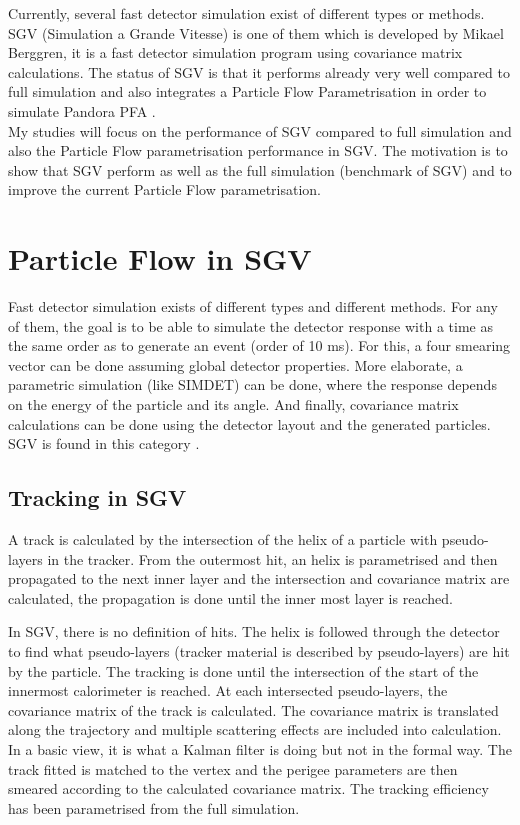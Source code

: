 Currently, several fast detector simulation exist of different types or methods. SGV (Simulation a Grande Vitesse) is one of them which is developed by Mikael Berggren, it is a fast detector simulation program using covariance matrix calculations. The status of SGV is that it performs already very well compared to full simulation and also integrates a Particle Flow Parametrisation in order to simulate Pandora PFA \cite{Berggren}.\\

My studies will focus on the performance of SGV compared to full simulation and also the Particle Flow parametrisation performance in SGV. The motivation is to show that SGV perform as well as the full simulation (benchmark of SGV) and to improve the current Particle Flow parametrisation.

\section{Particle Flow in SGV}

Fast detector simulation exists of different types and different methods. For any of them, the goal is to be able to simulate the detector response with a time as the same order as to generate an event (order of 10 ms).
For this, a four smearing vector can be done assuming global detector properties. More elaborate, a parametric simulation (like SIMDET) can be done, where the response depends on the energy of the particle and its angle.
And finally, covariance matrix calculations can be done using the detector layout and the generated particles. SGV is found in this category \cite{Berggren}.

\subsection{Tracking in SGV}

A track is calculated by the intersection of the helix of a particle with pseudo-layers in the tracker. From the outermost hit, an helix is parametrised and then propagated to the next inner layer and the intersection and covariance matrix are calculated, the propagation is done until the inner most layer is reached.

In SGV, there is no definition of hits. The helix is followed through the detector to find what pseudo-layers (tracker material is described by pseudo-layers) are hit by the particle. The tracking is done until the intersection of the start of the innermost calorimeter is reached. At each intersected pseudo-layers, the covariance matrix of the track is calculated.  The covariance matrix is translated along the trajectory and multiple scattering effects are included into calculation.
In a basic view, it is what a Kalman filter is doing but not in the formal way. The track fitted is matched to the vertex and the perigee parameters are then smeared according to the calculated covariance matrix. The tracking efficiency has been parametrised from the full simulation.

